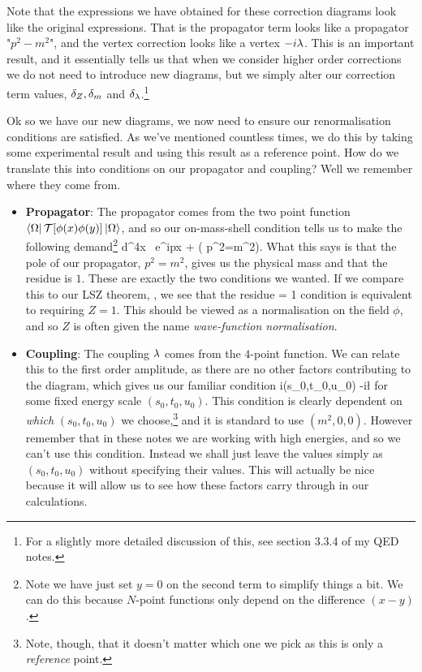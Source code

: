 \br 
\label{rem:HigherOrderCorrections}
    Note that the expressions we have obtained for these correction diagrams look like the original expressions. That is the propagator term looks like a propagator "$p^2-m^2$", and the vertex correction looks like a vertex $-i\lambda$. This is an important result, and it essentially tells us that when we consider higher order corrections we do not need to introduce new diagrams, but we simply alter our correction term values, $\delta_Z, \delta_m$ and $\delta_{\lambda}$.\footnote{For a slightly more detailed discussion of this, see section 3.3.4 of my QED notes.}
\er 

Ok so we have our new diagrams, we now need to ensure our renormalisation conditions are satisfied. As we've mentioned countless times, we do this by taking some experimental result and using this result as a reference point. How do we translate this into conditions on our propagator and coupling? Well we remember where they come from.

\begin{itemize}
    \item \textbf{Propagator}: The propagator comes from the two point function $\bra{\Omega}\mathcal{T}[\phi(x)\phi(y)]\ket{\Omega}$, and so our on-mass-shell condition tells us to make the following demand\footnote{Note we have just set $y=0$ on the second term to simplify things a bit. We can do this because $N$-point functions only depend on the difference $(x-y)$.}
    \be
    \label{eqn:PropagatorRenormCondition}
        \int d^4x \, e^{ip\cdot x} \bra{\Omega}\ket{\Omega} \overset{!}{=}  + ( p^2=m^2).
    \ee 
    What this says is that the pole of our propagator, $p^2=m^2$, gives us the physical mass and that the residue is $1$. These are exactly the two conditions we wanted. If we compare this to our LSZ theorem, , we see that the residue = 1 condition is equivalent to requiring $Z=1$. This should be viewed as a normalisation on the field $\phi$, and so $Z$ is often given the name \textit{wave-function normalisation}. 
    \item \textbf{Coupling}: The coupling $\lambda$ comes from the $4$-point function. We can relate this to the first order amplitude, as there are no other factors contributing to the diagram, which gives us our familiar condition 
    \be
    \label{eqn:CouplingRenormCondition}
        i\cM(s_0,t_0,u_0) \overset{!}{=} -i\l
    \ee 
    for some fixed energy scale $(s_0,t_0,u_0)$. This condition is clearly dependent on \textit{which} $(s_0,t_0,u_0)$ we choose,\footnote{Note, though, that it doesn't matter which one we pick as this is only a \textit{reference} point.} and it is standard to use $(m^2,0,0)$. However remember that in these notes we are working with high energies, and so we can't use this condition. Instead we shall just leave the values simply as $(s_0,t_0,u_0)$ without specifying their values. This will actually be nice because it will allow us to see how these factors carry through in our calculations. 
\end{itemize}

